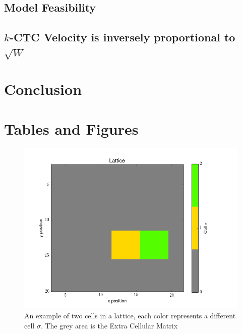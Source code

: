 \documentclass[12pt]{article}
\begin{document}
\subsection{Model Feasibility}

\subsection{$k$-CTC Velocity is inversely proportional to $\sqrt{W}$ }

\section{Conclusion}


\pagebreak
\section{Tables and Figures}

\begin{figure}[H]
	\centering
	\includegraphics[scale=0.5]{img/basic}
	\caption{An example of two cells in a lattice, each color represents a different cell $\sigma$. The grey area is the Extra Cellular Matrix}
	\label{basic}
\end{figure}
\end{document}
